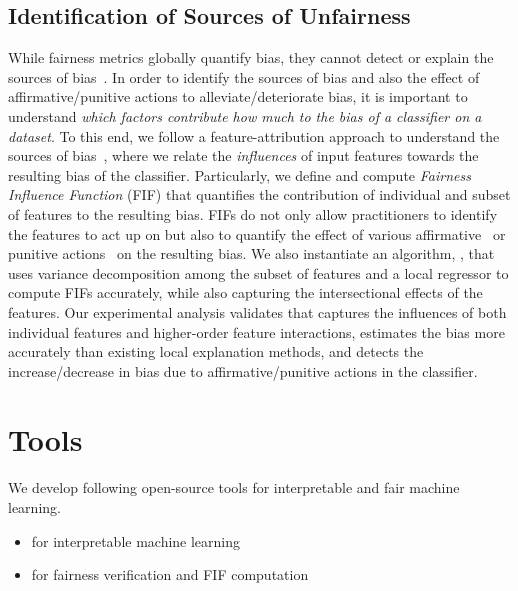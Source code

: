 \subsection*{Identification of Sources of Unfairness}
While fairness metrics globally quantify bias, they cannot detect or explain the sources of bias~\cite{begley2020explainability,lundberg2020explaining,pan2021explaining}. In order to identify the sources of bias and also the effect of affirmative/punitive actions to alleviate/deteriorate bias, it is important to understand \textit{which factors contribute how much to the bias of a classifier on a dataset}. To this end, we follow a feature-attribution approach to understand the sources of bias~\cite{begley2020explainability,lundberg2020explaining}, where we relate the \emph{influences} of input features towards the resulting bias of the classifier. Particularly, we define and compute \textit{Fairness Influence Function} (FIF) that quantifies the contribution of individual and subset of features to the resulting bias. FIFs do not only allow practitioners to identify the features to act up on but also to quantify the effect of various affirmative~\cite{calmon2017optimized,hardt2016equality,kamiran2012decision,zemel2013learning,zhang2018mitigating,zhang2018fairness,zhang2019faht} or punitive actions~\cite{hua2021human,mehrabi2020exacerbating,solans2020poisoning} on the resulting bias. We also instantiate an algorithm, {\fairXplainer}, that uses variance decomposition among the subset of features and a local regressor to compute FIFs accurately, while also capturing the intersectional effects of the features. Our experimental analysis validates that {\fairXplainer} captures the influences of both individual features and higher-order feature interactions, estimates the bias more accurately than existing local explanation methods, and detects the increase/decrease in bias due to affirmative/punitive actions in the classifier.

\section{Tools}
	We develop following open-source tools for interpretable and fair machine learning.
	\begin{itemize}
		\item \href{https://github.com/meelgroup/MLIC}{{\imli}} for interpretable machine learning
		\item  \href{https://github.com/meelgroup/justicia}{\justicia} for fairness verification and FIF computation
	\end{itemize}
